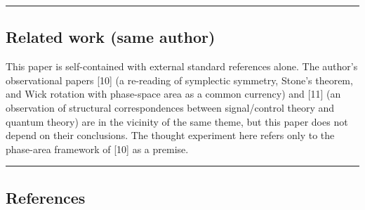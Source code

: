 \documentclass[
]{article}
\begin{document}
\begin{center}\rule{0.5\linewidth}{0.5pt}\end{center}

\subsection{Related work (same author)}\label{related-work-same-author}

This paper is self-contained with external standard references alone.
The author's observational papers {[}10{]} (a re-reading of symplectic
symmetry, Stone's theorem, and Wick rotation with phase-space area as a
common currency) and {[}11{]} (an observation of structural
correspondences between signal/control theory and quantum theory) are in
the vicinity of the same theme, but this paper does not depend on their
conclusions. The thought experiment here refers only to the phase-area
framework of {[}10{]} as a premise.

\begin{center}\rule{0.5\linewidth}{0.5pt}\end{center}

\subsection{References}\label{references}
\end{document}
